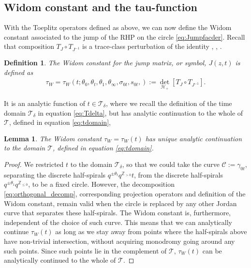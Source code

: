 \documentclass[a4paper,reqno,11pt]{amsart}
\numberwithin{equation}{section}
\numberwithin{figure}{section}
\theoremstyle{plain}
\newtheorem{lemma}[theorem]{Lemma}
\newtheorem{definition}[theorem]{Definition}
\theoremstyle{remark}
\numberwithin{rhp}{section}
\begin{document}
\subsection{Widom constant and the tau-function}
With the Toeplitz operators defined as above, we can now define the Widom constant associated to the jump of the RHP on the circle \eqref{eq:Jumpfacder}. Recall that composition $T_{J}\circ T_{J^{-1}}$ is a trace-class perturbation of the identity \cite{CGL2017}, \cite{basor2012toeplitz}, \cite{widom1974asymptotic}.

\begin{definition}\label{def:widomconstant}
  The Widom constant for the jump matrix, or symbol, $J(z,t)$ is defined as
    \begin{align}\label{def:Widom}
        \tau_{W}=\tau_{W}(t; \theta_0, \theta_t, \theta_{1}, \theta_{\infty}, \sigma_{0t}, s_{0t},):= \det_{\mathcal{H}_{+}} \left[T_{J}\circ T_{J^{-1}} \right].
    \end{align}
\end{definition}
    It is an analytic function of $t\in \mathcal{T}_\delta$, where we recall the definition of the time domain $\mathcal{T}_\delta$ in equation \eqref{eq:Tdelta}, but has analytic continuation to the whole of $\mathcal{T}$, defined in equation \eqref{eq:tdomain},



    
\begin{lemma}\label{prop:tau_analytic_continuation}
The Widom constant $\tau_W=\tau_W(t)$ has unique analytic continuation to the domain $\mathcal{T}$, defined in equation \eqref{eq:tdomain}.
\end{lemma}
\begin{proof}
We restricted $t$ to the domain $\mathcal{T}_\delta$, so that we could take the curve $\mathcal{C}:=\gamma_{0t}$, separating the discrete half-spirals $q^{\pm \theta_t}q^{\mathbb{Z}_{>0}}t$, from the discrete half-spirals $q^{\pm \theta_1}q^{\mathbb{Z}_{\leq 0}}$, to be a fixed circle. However, the decomposition \eqref{eq:orthogonal_decomp}, corresponding projection operators and definition of the Widom constant, remain valid when the circle is replaced by any other Jordan curve that separates these half-spirals. The Widom constant is, furthermore, independent of the choice of such curve. This means that we can analytically continue $\tau_W(t)$ as long as we stay away from points where the half-spirals above have non-trivial intersection, without acquiring monodromy going around any such points. Since such points lie in the complement of $\mathcal{T}$, $\tau_W(t)$ can be analytically continued to the whole of $\mathcal{T}$.
\end{proof}
\end{document}
